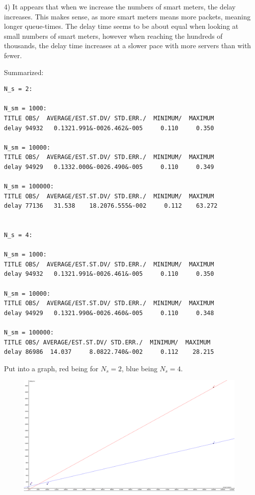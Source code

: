 \documentclass[11pt]{article}
\begin{document}
\newpage

4) It appears that when we increase the numbers of smart meters, the delay increases. This makes sense, as more smart meters means more packets, meaning longer queue-times. The delay time seems to be about equal when looking at small numbers of smart meters, however when reaching the hundreds of thousands, the delay time increases at a slower pace with more servers than with fewer. 

Summarized:

\begin{lstlisting}
N_s = 2:

N_sm = 1000:
TITLE OBS/  AVERAGE/EST.ST.DV/ STD.ERR./  MINIMUM/  MAXIMUM
delay 94932   0.1321.991&-0026.462&-005     0.110     0.350

N_sm = 10000:
TITLE OBS/  AVERAGE/EST.ST.DV/ STD.ERR./  MINIMUM/  MAXIMUM
delay 94929   0.1332.000&-0026.490&-005     0.110     0.349

N_sm = 100000:
TITLE OBS/  AVERAGE/EST.ST.DV/ STD.ERR./  MINIMUM/  MAXIMUM
delay 77136   31.538    18.2076.555&-002     0.112    63.272


N_s = 4:

N_sm = 1000:
TITLE OBS/  AVERAGE/EST.ST.DV/ STD.ERR./  MINIMUM/  MAXIMUM
delay 94932   0.1321.991&-0026.461&-005     0.110     0.350

N_sm = 10000:
TITLE OBS/  AVERAGE/EST.ST.DV/ STD.ERR./  MINIMUM/  MAXIMUM
delay 94929   0.1321.990&-0026.460&-005     0.110     0.348

N_sm = 100000:
TITLE OBS/ AVERAGE/EST.ST.DV/ STD.ERR./  MINIMUM/  MAXIMUM
delay 86986  14.037     8.0822.740&-002     0.112    28.215

\end{lstlisting}

Put into a graph, red being for $N_s = 2$, blue being $N_s = 4$.

\begin{figure}
	\includegraphics[width=\textwidth]{geogebrabilde.png}
	\centering
\end{figure}
\end{document}
